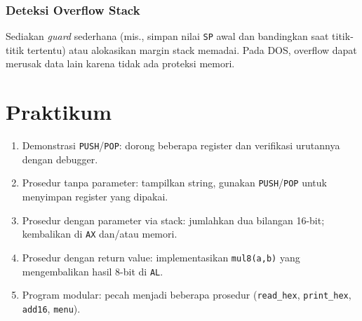 \documentclass[../main.tex]{subfiles}
\begin{document}
\subsubsection{Deteksi Overflow Stack}
Sediakan \textit{guard} sederhana (mis., simpan nilai \texttt{SP} awal dan bandingkan saat titik-titik tertentu) atau alokasikan margin stack memadai. Pada DOS, overflow dapat merusak data lain karena tidak ada proteksi memori.

\section{Praktikum}
\begin{enumerate}
  \item Demonstrasi \texttt{PUSH}/\texttt{POP}: dorong beberapa register dan verifikasi urutannya dengan debugger.
  \item Prosedur tanpa parameter: tampilkan string, gunakan \texttt{PUSH}/\texttt{POP} untuk menyimpan register yang dipakai.
  \item Prosedur dengan parameter via stack: jumlahkan dua bilangan 16-bit; kembalikan di \texttt{AX} dan/atau memori.
  \item Prosedur dengan return value: implementasikan \texttt{mul8(a,b)} yang mengembalikan hasil 8-bit di \texttt{AL}.
  \item Program modular: pecah menjadi beberapa prosedur (\texttt{read\_hex}, \texttt{print\_hex}, \texttt{add16}, \texttt{menu}).
\end{enumerate}
\end{document}
